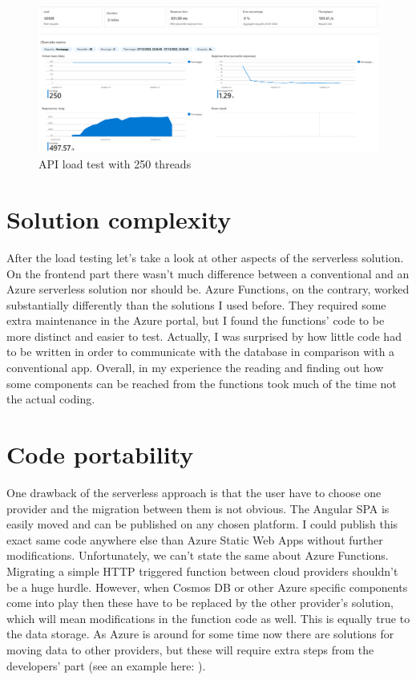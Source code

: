 \begin{figure}[!ht]
	\centering
	\includegraphics[width=150mm, keepaspectratio]{figures/loadtest/funcapp250-2.png}
	\caption{API load test with 250 threads} 
	\label{fig:APIlt}
\end{figure}

\section{Solution complexity}

After the load testing let's take a look at other aspects of the serverless solution. On the frontend part there wasn't much difference between a conventional and an Azure serverless solution nor should be. Azure Functions, on the contrary, worked substantially differently than the solutions I used before. They required some extra maintenance in the Azure portal, but I found the functions' code to be more distinct and easier to test. Actually, I was surprised by how little code had to be written in order to communicate with the database in comparison with a conventional app. Overall, in my experience the reading and finding out how some components can be reached from the functions took much of the time not the actual coding.

\section{Code portability}

One drawback of the serverless approach is that the user have to choose one provider and the migration between them is not obvious. The Angular SPA is easily moved and can be published on any chosen platform. I could publish this exact same code anywhere else than Azure Static Web Apps without further modifications. Unfortunately, we can't state the same about Azure Functions. Migrating a simple HTTP triggered function between cloud providers shouldn't be a huge hurdle. However, when Cosmos DB or other Azure specific components come into play then these have to be replaced by the other provider's solution, which will mean modifications in the function code as well. This is equally true to the data storage. As Azure is around for some time now there are solutions for moving data to other providers, but these will require extra steps from the developers' part (see an example here: \cite{MongoMoveData}).
